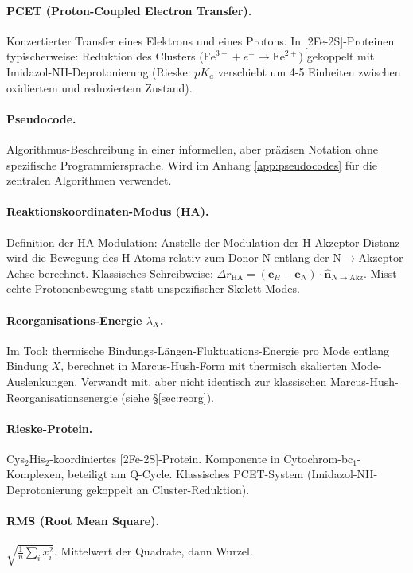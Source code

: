 \documentclass[11pt,a4paper,twoside]{article}
\theoremstyle{remark}
\begin{document}
\paragraph{PCET (Proton-Coupled Electron Transfer).}
Konzertierter Transfer eines Elektrons und eines Protons. In
[2Fe-2S]-Proteinen typischerweise: Reduktion des Clusters
($\text{Fe}^{3+} + e^- \to \text{Fe}^{2+}$) gekoppelt mit
Imidazol-NH-Deprotonierung (Rieske: $pK_a$ verschiebt um 4-5
Einheiten zwischen oxidiertem und reduziertem Zustand).

\paragraph{Pseudocode.}
Algorithmus-Beschreibung in einer informellen, aber pr\"azisen
Notation ohne spezifische Programmiersprache. Wird im
Anhang \ref{app:pseudocodes} f\"ur die zentralen Algorithmen
verwendet.

\paragraph{Reaktionskoordinaten-Modus (HA).}
Definition der HA-Modulation: Anstelle der Modulation der
H-Akzeptor-Distanz wird die Bewegung des H-Atoms relativ zum
Donor-N entlang der N$\to$Akzeptor-Achse berechnet. Klassisches
Schreibweise: $\Delta r_\text{HA} = (\mathbf{e}_H - \mathbf{e}_N)
\cdot \hat{\mathbf{n}}_{N\to\text{Akz}}$. Misst echte
Protonenbewegung statt unspezifischer Skelett-Modes.

\paragraph{Reorganisations-Energie $\lambda_X$.}
Im Tool: thermische Bindungs-L\"angen-Fluktuations-Energie pro
Mode entlang Bindung $X$, berechnet in Marcus-Hush-Form mit
thermisch skalierten Mode-Auslenkungen. Verwandt mit, aber nicht
identisch zur klassischen Marcus-Hush-Reorganisationsenergie
(siehe \S\ref{sec:reorg}).

\paragraph{Rieske-Protein.}
Cys$_2$His$_2$-koordiniertes [2Fe-2S]-Protein. Komponente in
Cytochrom-bc$_1$-Komplexen, beteiligt am Q-Cycle. Klassisches
PCET-System (Imidazol-NH-Deprotonierung gekoppelt an
Cluster-Reduktion).

\paragraph{RMS (Root Mean Square).}
$\sqrt{\frac{1}{n}\sum_i x_i^2}$. Mittelwert der Quadrate, dann
Wurzel.
\end{document}
